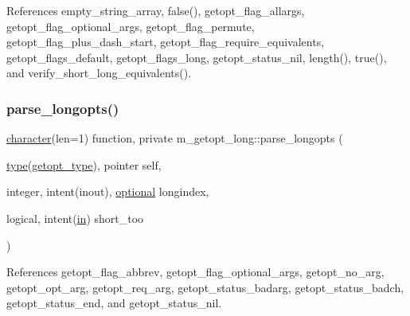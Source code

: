References empty\+\_\+string\+\_\+array, false(), getopt\+\_\+flag\+\_\+allargs, getopt\+\_\+flag\+\_\+optional\+\_\+args, getopt\+\_\+flag\+\_\+permute, getopt\+\_\+flag\+\_\+plus\+\_\+dash\+\_\+start, getopt\+\_\+flag\+\_\+require\+\_\+equivalents, getopt\+\_\+flags\+\_\+default, getopt\+\_\+flags\+\_\+long, getopt\+\_\+status\+\_\+nil, length(), true(), and verify\+\_\+short\+\_\+long\+\_\+equivalents().

\mbox{\label{namespacem__getopt__long_a7bad6d8d4067d578429da9282bc82ada}} 
\subsubsection{\texorpdfstring{parse\+\_\+longopts()}{parse\_longopts()}}
{\footnotesize\ttfamily \hyperlink{option__stopwatch_83_8txt_abd4b21fbbd175834027b5224bfe97e66}{character}(len=1) function, private m\+\_\+getopt\+\_\+long\+::parse\+\_\+longopts (\begin{DoxyParamCaption}\item[{\hyperlink{stop__watch_83_8txt_a70f0ead91c32e25323c03265aa302c1c}{type}(\hyperlink{structm__getopt__long_1_1getopt__type}{getopt\+\_\+type}), pointer}]{self,  }\item[{integer, intent(inout), \hyperlink{option__stopwatch_83_8txt_aa4ece75e7acf58a4843f70fe18c3ade5}{optional}}]{longindex,  }\item[{logical, intent(\hyperlink{M__journal_83_8txt_afce72651d1eed785a2132bee863b2f38}{in})}]{short\+\_\+too }\end{DoxyParamCaption})\hspace{0.3cm}{\ttfamily [private]}}



References getopt\+\_\+flag\+\_\+abbrev, getopt\+\_\+flag\+\_\+optional\+\_\+args, getopt\+\_\+no\+\_\+arg, getopt\+\_\+opt\+\_\+arg, getopt\+\_\+req\+\_\+arg, getopt\+\_\+status\+\_\+badarg, getopt\+\_\+status\+\_\+badch, getopt\+\_\+status\+\_\+end, and getopt\+\_\+status\+\_\+nil.

\mbox{\label{namespacem__getopt__long_a55045492836fd218379126cbdcee24ea}} 
